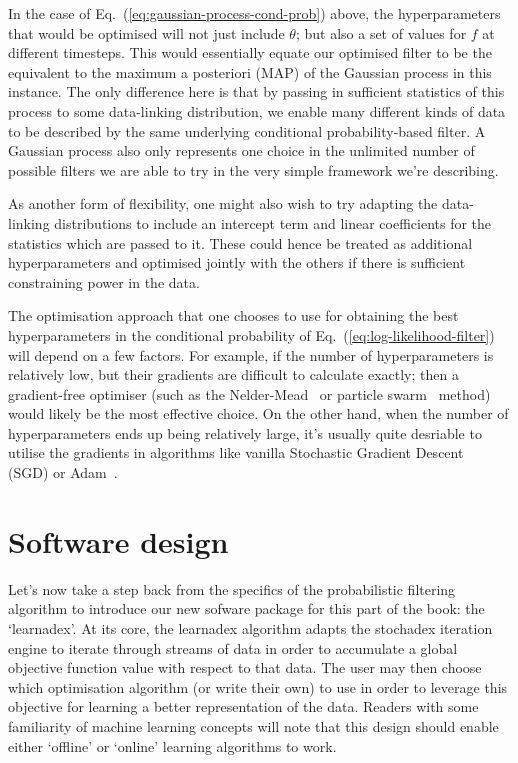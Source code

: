 In the case of Eq.~(\ref{eq:gaussian-process-cond-prob}) above, the hyperparameters that would be optimised will not just include $\theta$; but also a set of values for $f$ at different timesteps. This would essentially equate our optimised filter to be the equivalent to the maximum a posteriori (MAP) of the Gaussian process in this instance. The only difference here is that by passing in sufficient statistics of this process to some data-linking distribution, we enable many different kinds of data to be described by the same underlying conditional probability-based filter. A Gaussian process also only represents one choice in the unlimited number of possible filters we are able to try in the very simple framework we're describing. 

As another form of flexibility, one might also wish to try adapting the data-linking distributions to include an intercept term and linear coefficients for the statistics which are passed to it. These could hence be treated as additional hyperparameters and optimised jointly with the others if there is sufficient constraining power in the data.

The optimisation approach that one chooses to use for obtaining the best hyperparameters in the conditional probability of Eq.~(\ref{eq:log-likelihood-filter}) will depend on a few factors. For example, if the number of hyperparameters is relatively low, but their gradients are difficult to calculate exactly; then a gradient-free optimiser (such as the Nelder-Mead~\cite{nelder1965simplex} or particle swarm~\cite{kennedy1995particle, shi1998modified} method) would likely be the most effective choice. On the other hand, when the number of hyperparameters ends up being relatively large, it's usually quite desriable to utilise the gradients in algorithms like vanilla Stochastic Gradient Descent~\cite{robbins1951stochastic} (SGD) or Adam~\cite{kingma2014adam}.

\section{\sffamily Software design}

Let's now take a step back from the specifics of the probabilistic filtering algorithm to introduce our new sofware package for this part of the book: the `learnadex'. At its core, the learnadex algorithm adapts the stochadex iteration engine to iterate through streams of data in order to accumulate a global objective function value with respect to that data. The user may then choose which optimisation algorithm (or write their own) to use in order to leverage this objective for learning a better representation of the data. Readers with some familiarity of machine learning concepts will note that this design should enable either `offline' or `online' learning algorithms to work.


